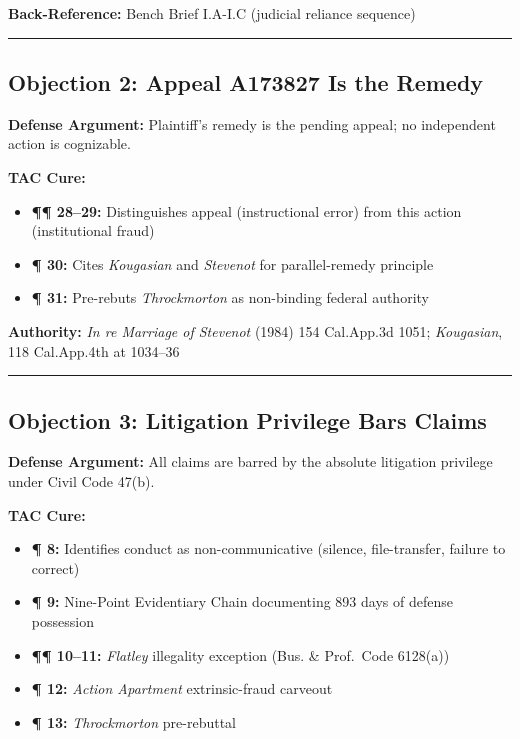 \textbf{Back-Reference:} Bench Brief \textsection{}\textsection{} I.A-I.C (judicial reliance sequence)

\begin{center}\rule{0.5\linewidth}{0.5pt}\end{center}

\subsection{Objection 2: Appeal A173827 Is the Remedy}\label{objection-2-appeal-a173827-is-the-remedy}

\textbf{Defense Argument:} Plaintiff's remedy is the pending appeal; no independent action is cognizable.

\textbf{TAC Cure:}

\begin{itemize}
\tightlist
\item
  \textbf{¶¶ 28--29:} Distinguishes appeal (instructional error) from this action (institutional fraud)
\item
  \textbf{¶ 30:} Cites \emph{Kougasian} and \emph{Stevenot} for parallel-remedy principle
\item
  \textbf{¶ 31:} Pre-rebuts \emph{Throckmorton} as non-binding federal authority
\end{itemize}

\textbf{Authority:} \emph{In re Marriage of Stevenot} (1984) 154 Cal.App.3d 1051; \emph{Kougasian}, 118 Cal.App.4th at 1034--36

\begin{center}\rule{0.5\linewidth}{0.5pt}\end{center}

\subsection{Objection 3: Litigation Privilege Bars Claims}\label{objection-3-litigation-privilege-bars-claims}

\textbf{Defense Argument:} All claims are barred by the absolute litigation privilege under Civil Code \textsection{} 47(b).

\textbf{TAC Cure:}

\begin{itemize}
\tightlist
\item
  \textbf{¶ 8:} Identifies conduct as non-communicative (silence, file-transfer, failure to correct)
\item
  \textbf{¶ 9:} Nine-Point Evidentiary Chain documenting 893 days of defense possession
\item
  \textbf{¶¶ 10--11:} \emph{Flatley} illegality exception (Bus. \& Prof.~Code \textsection{} 6128(a))
\item
  \textbf{¶ 12:} \emph{Action Apartment} extrinsic-fraud carveout
\item
  \textbf{¶ 13:} \emph{Throckmorton} pre-rebuttal
\end{itemize}

